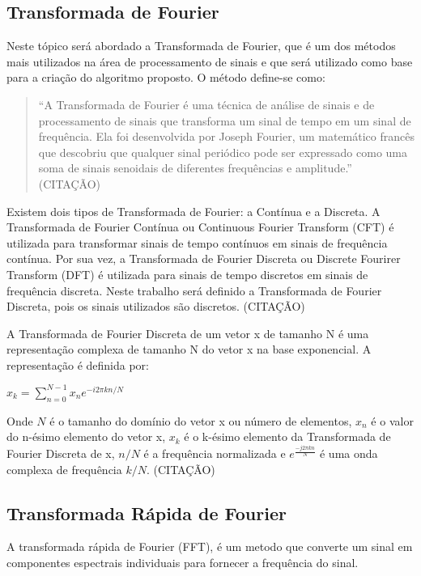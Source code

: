 \documentclass{sbrt}
\begin{document}
\subsection{Transformada de Fourier}

Neste tópico será abordado a Transformada de Fourier, que é um dos métodos mais utilizados na área de processamento de sinais e que será utilizado como base para a criação do algoritmo proposto. O método define-se como:


\begin{quote}
  “A Transformada de Fourier é uma técnica de análise de sinais e de processamento de sinais que transforma um sinal de tempo em um sinal de frequência. Ela foi desenvolvida por Joseph Fourier, um matemático francês que descobriu que qualquer sinal periódico pode ser expressado como uma soma de sinais senoidais de diferentes frequências e amplitude.” (CITAÇÃO)
\end{quote}

Existem dois tipos de Transformada de Fourier: a Contínua e a Discreta. A Transformada de Fourier Contínua ou Continuous Fourier Transform (CFT) é utilizada para transformar sinais de tempo contínuos em sinais de frequência contínua. Por sua vez, a Transformada de Fourier Discreta ou Discrete Fourirer Transform (DFT) é utilizada para sinais de tempo discretos em sinais de frequência discreta. Neste trabalho será definido a Transformada de Fourier Discreta, pois os sinais utilizados são discretos. (CITAÇÃO)

A Transformada de Fourier Discreta de um vetor x de tamanho N é uma representação complexa de tamanho N do vetor x na base exponencial. A representação é definida por:

\begin{center}
  $x_k = \sum_{n=0}^{N-1} x_n e^{-i 2\pi kn/N}$
\end{center}

Onde $N$ é o tamanho do domínio do vetor x ou número de elementos, $x_n$ é o valor do n-ésimo elemento do vetor x, $x_k$ é o k-ésimo elemento da Transformada de Fourier Discreta de x, $n/N$ é a frequência normalizada e $e^{\frac{-j 2 \pi k n}{N}}$ é uma onda complexa de frequência $k/N$. (CITAÇÃO)

\subsection{Transformada Rápida de Fourier}

A transformada rápida de Fourier (FFT), é um metodo que  converte um sinal em componentes espectrais individuais para fornecer a frequência do sinal.
\end{document}
